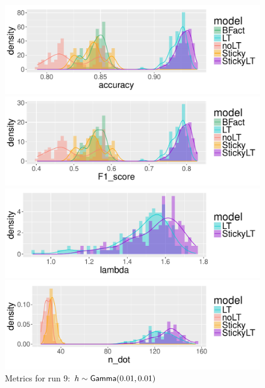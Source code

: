 \begin{figure}[tb]
  \centering
  \begin{minipage}{0.75\textwidth}
  \includegraphics[width = \textwidth]{fig/cocktail/synth_s16_m12/hyper_h/h10.0_nocs_cp0/a0p01b0p01/accuracy_density.pdf}
\end{minipage}

\begin{minipage}{0.75\textwidth}
  \includegraphics[width = \textwidth]{fig/cocktail/synth_s16_m12/hyper_h/h10.0_nocs_cp0/a0p01b0p01/F1_score_density.pdf}
\end{minipage}

\begin{minipage}{0.75\textwidth}
  \includegraphics[width = \textwidth]{fig/cocktail/synth_s16_m12/hyper_h/h10.0_nocs_cp0/a0p01b0p01/lambda_density.pdf}
\end{minipage}

\begin{minipage}{0.75\textwidth}
  \includegraphics[width = \textwidth]{fig/cocktail/synth_s16_m12/hyper_h/h10.0_nocs_cp0/a0p01b0p01/n_dot_density.pdf}
\end{minipage}
\caption{Metrics for run 9: $h \sim \mathsf{Gamma}(0.01,0.01)$}
\end{figure}

